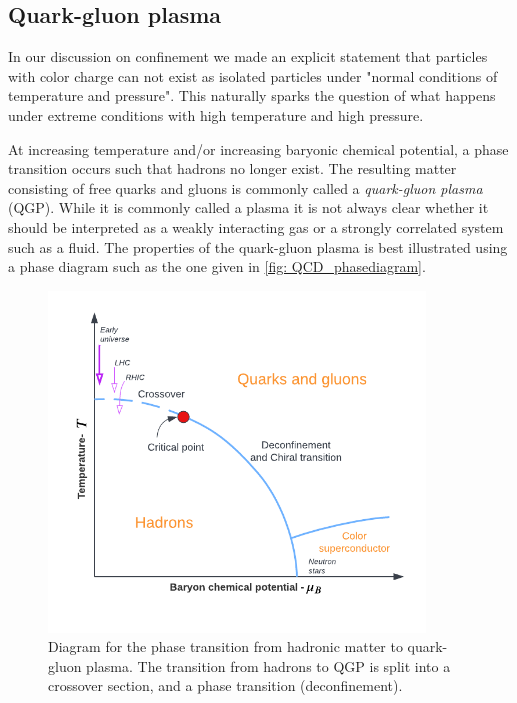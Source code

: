 \documentclass[main.tex]{subfiles}
\begin{document}
\subsection{Quark-gluon plasma}
In our discussion on confinement we made an explicit statement that particles with color charge can not exist as isolated particles under "normal conditions of temperature and pressure". This naturally sparks the question of what happens under extreme conditions with high temperature and high pressure.

At increasing temperature and/or increasing baryonic chemical potential, a phase transition occurs such that hadrons no longer exist. The resulting matter consisting of free quarks and gluons is commonly called a \emph{quark-gluon plasma} (QGP). While it is commonly called a plasma it is not always clear whether it should be interpreted as a weakly interacting gas or a strongly correlated system such as a fluid. 
The properties of the quark-gluon plasma is best illustrated using a phase diagram such as the one given in \autoref{fig: QCD_phasediagram}.
\begin{figure}[htb]
    \centering
    \includegraphics[width=10cm]{pictures/figures/QCD_phasediagram.png}
    \caption{Diagram for the phase transition from hadronic matter to quark-gluon plasma. The transition from hadrons to QGP is split into a crossover section, and a phase transition (deconfinement).}
    \label{fig: QCD_phasediagram}
\end{figure}
\end{document}
